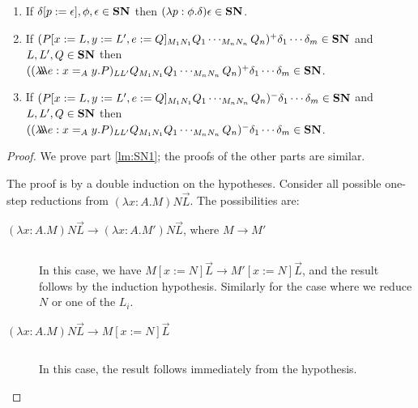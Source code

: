 \begin{lemma}
\begin{enumerate}
\item
If $\delta[p:=\epsilon], \phi, \epsilon \in \mathbf{SN}$ then $(\lambda p:\phi.\delta)\epsilon \in \mathbf{SN}$.
\item
If $(P[x:=L, y:=L', e:=Q]_{M_1 N_1} Q_1 \cdots_{M_n N_n} Q_n)^+ \delta_1 \cdots \delta_m \in \mathbf{SN}$ and $L, L', Q \in \mathbf{SN}$ then $((\lambda \!\! \lambda \!\! \lambda e:x =_A y.P)_{L L'} Q_{M_1 N_1} Q_1 \cdots_{M_n N_n} Q_n)^+ \delta_1 \cdots \delta_m \in \mathbf{SN}$.
\item
If $(P[x:=L, y:=L', e:=Q]_{M_1 N_1} Q_1 \cdots_{M_n N_n} Q_n)^- \delta_1 \cdots \delta_m \in \mathbf{SN}$ and $L, L', Q \in \mathbf{SN}$ then $((\lambda \!\! \lambda \!\! \lambda e:x =_A y.P)_{L L'} Q_{M_1 N_1} Q_1 \cdots_{M_n N_n} Q_n)^- \delta_1 \cdots \delta_m \in \mathbf{SN}$.
\end{enumerate}
\end{lemma}

\begin{proof}
We prove part \ref{lm:SN1}; the proofs of the other parts are similar.

The proof is by a double induction on the hypotheses.  Consider all possible one-step reductions from $(\lambda x:A.M) N \vec{L}$.  The possibilities are:
\begin{description}
\item[$(\lambda x:A.M) N \vec{L} \rightarrow (\lambda x:A.M')N \vec{L}$, where $M \rightarrow M'$]
$ $

In this case, we have $M[x:=N] \vec{L} \rightarrow M'[x:=N] \vec{L}$, and the result follows by the induction hypothesis.  Similarly for the case
where we reduce $N$ or one of the $L_i$.
\item[$(\lambda x:A.M)N \vec{L} \rightarrow M{[x:=N]} \vec{L}$]
$ $

In this case, the result follows immediately from the hypothesis.
\end{description}
\end{proof}

